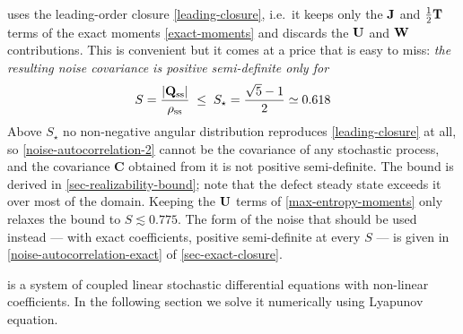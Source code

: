 \documentclass[a5paper]{article}
\begin{document}
 uses the leading-order closure \eqref{leading-closure}, i.e.\ it keeps only the $\mathbf{J}$ and $\tfrac12\mathbf{T}$ terms of the exact moments \eqref{exact-moments} and discards the $\mathbf{U}$ and $\mathbf{W}$ contributions. This is convenient but it comes at a price that is easy to miss: \emph{the resulting noise covariance is positive semi-definite only for}
\begin{align}
    \label{S-star-warning}
    S = \frac{|\mathbf{Q}_{\mathrm{ss}}|}{\rho_{\mathrm{ss}}} \;\le\; S_\star = \frac{\sqrt5 - 1}{2} \simeq 0.618
\end{align}
Above $S_\star$ no non-negative angular distribution reproduces \eqref{leading-closure} at all, so \cref{noise-autocorrelation-2} cannot be the covariance of any stochastic process, and the covariance $\mathbf{C}$ obtained from it is not positive semi-definite. The bound is derived in \cref{sec-realizability-bound}; note that the defect steady state exceeds it over most of the domain. Keeping the $\mathbf{U}$ terms of \eqref{max-entropy-moments} only relaxes the bound to $S \lesssim 0.775$. The form of the noise that should be used instead --- with exact coefficients, positive semi-definite at every $S$ --- is given in \cref{noise-autocorrelation-exact} of \cref{sec-exact-closure}.

 is a system of coupled linear stochastic differential equations with non-linear coefficients. In the following section we solve it numerically using Lyapunov equation.
 
\end{document}
